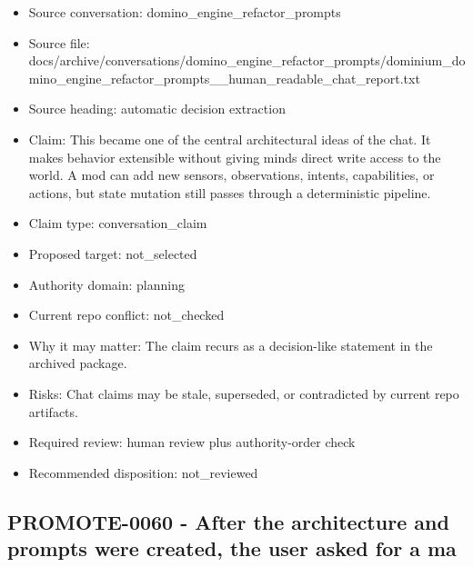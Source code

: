 \documentclass[11pt,a4paper]{report}
\begin{document}
\begin{itemize}
\item Source conversation: domino\_engine\_refactor\_prompts
\item Source file: docs/archive/conversations/domino\_engine\_refactor\_prompts/dominium\_domino\_engine\_refactor\_prompts\_\_human\_readable\_chat\_report.txt
\item Source heading: automatic decision extraction
\item Claim: This became one of the central architectural ideas of the chat. It makes behavior extensible without giving minds direct write access to the world. A mod can add new sensors, observations, intents, capabilities, or actions, but state mutation still passes through a deterministic pipeline.
\item Claim type: conversation\_claim
\item Proposed target: not\_selected
\item Authority domain: planning
\item Current repo conflict: not\_checked
\item Why it may matter: The claim recurs as a decision-like statement in the archived package.
\item Risks: Chat claims may be stale, superseded, or contradicted by current repo artifacts.
\item Required review: human review plus authority-order check
\item Recommended disposition: not\_reviewed
\end{itemize}

\subsection{PROMOTE-0060 - After the architecture and prompts were created, the user asked for a ma}
\end{document}
